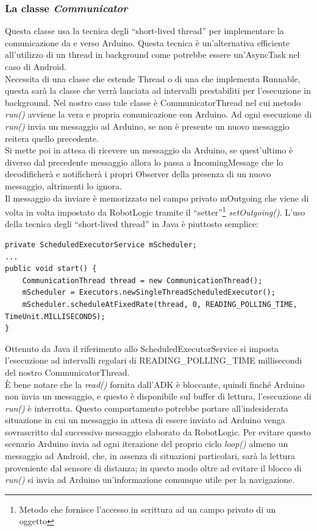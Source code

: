 \subsubsection{La classe \emph{Communicator}}
Questa classe usa la tecnica degli ``short-lived thread'' per implementare la comunicazione da e verso
Arduino. Questa tecnica è un'alternativa efficiente all'utilizzo di un thread in background come 
potrebbe essere un'AsyncTask nel caso di Android.\\
Necessita di una classe che estende Thread o di una che implementa Runnable, questa 
sarà la classe che verrà lanciata ad intervalli prestabiliti per l'esecuzione in background.
Nel nostro caso tale classe è CommunicatorThread nel cui metodo \emph{run()} avviene
la vera e propria comunicazione con Arduino. Ad ogni esecuzione di \emph{run()} 
invia un messaggio ad Arduino, se non è presente un nuovo messaggio reitera quello precedente.\\
Si mette poi in attesa di ricevere un messaggio da Arduino, se quest'ultimo è 
diverso dal precedente messaggio allora lo passa a IncomingMessage che lo decodificherà
e notificherà i propri Observer della presenza di un nuovo messaggio, altrimenti lo ignora.\\
Il messaggio da inviare è memorizzato nel campo privato mOutgoing che viene di volta 
in volta impostato da RobotLogic tramite il ``setter''\footnote{Metodo che fornisce 
l'accesso in scrittura ad un campo privato di un oggetto} \emph{setOutgoing()}.
L'uso della tecnica degli ``short-lived thread'' in Java è piuttosto semplice:
\begin{lstlisting}[caption=Metodo di inizializzazzione degli short-lived thread in Communicator] 
private ScheduledExecutorService mScheduler;
...
public void start() {
    CommunicationThread thread = new CommunicationThread();
    mScheduler = Executors.newSingleThreadScheduledExecutor();
    mScheduler.scheduleAtFixedRate(thread, 0, READING_POLLING_TIME, TimeUnit.MILLISECONDS);
}
\end{lstlisting}
Ottenuto da Java il riferimento allo ScheduledExecutorService si imposta l'esecuzione ad 
intervalli regolari di READING\_POLLING\_TIME millisecondi del nostro CommunicatorThread.\\ 
È bene notare che la \emph{read()} fornita dall'ADK è bloccante, quindi finché Arduino
non invia un messaggio, e questo è disponibile sul buffer di lettura, l'esecuzione di 
\emph{run()} è interrotta. Questo comportamento potrebbe portare 
all'indesiderata situazione in cui un messaggio in attesa di essere inviato ad Arduino
venga sovrascritto dal successivo messaggio elaborato da RobotLogic. Per evitare questo scenario
Arduino invia ad ogni iterazione del proprio ciclo \emph{loop()} almeno un messaggio ad
Android, che, in assenza di situazioni particolari, sarà la lettura proveniente dal 
sensore di distanza; in questo modo oltre ad evitare il blocco di \emph{run()} 
si invia ad Arduino un'informazione comunque utile per la navigazione.
